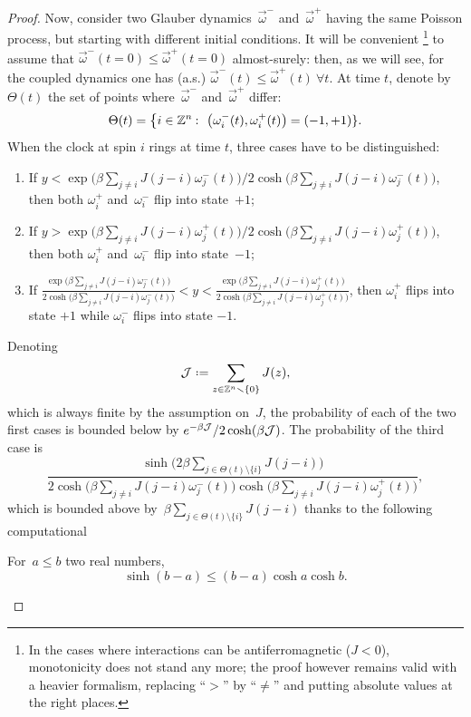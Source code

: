 \begin{proof}
Now, consider two Glauber dynamics~$\vec\omega^-$ and~$\vec\omega^+$
having the same Poisson process, but starting with different initial conditions.
It will be convenient%
\footnote{In the cases where interactions can be antiferromagnetic ($J<0$),
monotonicity does not stand any more;
the proof however remains valid with a heavier formalism,
replacing ``$>$'' by ``$\neq$'' and putting absolute values at the right places.}
to assume that $\vec\omega^-(t=0) \leq \vec\omega^+(t=0)$ almost-surely:
then, as we will see, for the coupled dynamics
one has (a.s.) $\vec\omega^-(t) \leq \vec\omega^+(t) \ \forall t$.
At time $t$, denote by~$\Theta(t)$ the set of points where~$\vec\omega^-$ and~$\vec\omega^+$ differ:
\[ \Theta(t) = \big\{ i\in\ZZ^n \colon \big(\omega^-_i(t), \omega^+_i(t)\big) = (-1,+1) \} .\]
%
When the clock at spin $i$ rings at time $t$, three cases have to be distinguished:
\begin{enumerate}
\item If $y < \exp\big(\beta\sum_{j\neq i}J(j-i)\omega^-_j(t)\big) \mathbin{\big/}
2\cosh\big(\beta\sum_{j\neq i}J(j-i)\omega^-_j(t)\big)$,
then both $\omega^+_i$ and~$\omega^-_i$ flip into state~$+1$;
\item If $y > \exp\big(\beta\sum_{j\neq i}J(j-i)\omega^+_j(t)\big) \mathbin{\big/}
2\cosh\big(\beta\sum_{j\neq i}J(j-i)\omega^+_j(t)\big)$,
then both $\omega^+_i$ and~$\omega^-_i$ flip into state~$-1$;
\item If $\frac{\exp\big(\beta\sum_{j\neq i}J(j-i)\omega^-_j(t)\big)}
{2\cosh\big(\beta\sum_{j\neq i}J(j-i)\omega^-_j(t)\big)} < y
< \frac{\exp\big(\beta\sum_{j\neq i}J(j-i)\omega^+_j(t)\big)}
{2\cosh\big(\beta\sum_{j\neq i}J(j-i)\omega^+_j(t)\big)}$,
then $\omega^+_i$ flips into state $+1$ while $\omega^-_i$ flips into state $-1$.
\end{enumerate}
%
Denoting
\[ \mcal{J} \coloneqq \sum_{z\in\ZZ^n\setminus\{0\}} J(z) ,\]
which is always finite by the assumption on~$J$,
the probability of each of the two first cases is bounded below by
$e^{-\beta\mathcal{J}} / 2\cosh(\beta\mathcal{J})$.
%
The probability of the third case is
\[ \frac{\sinh\big(2\beta\sum_{j\in\Theta(t)\setminus\{i\}} J(j-i)\big)}
{2\cosh\big(\beta\sum_{j\neq i}J(j-i)\omega^-_j(t)\big)
\cosh\big(\beta\sum_{j\neq i}J(j-i)\omega^+_j(t)\big)} ,\]
which is bounded above by~$\beta \sum_{j\in\Theta(t)\setminus\{i\}} {J(j-i)}$
thanks to the following computational
%
\begin{Lem}
For~$a \leq b$ two real numbers,
\[ \sinh(b-a) \leq (b-a) \cosh a \cosh b .\]
\end{Lem}

\end{proof}
